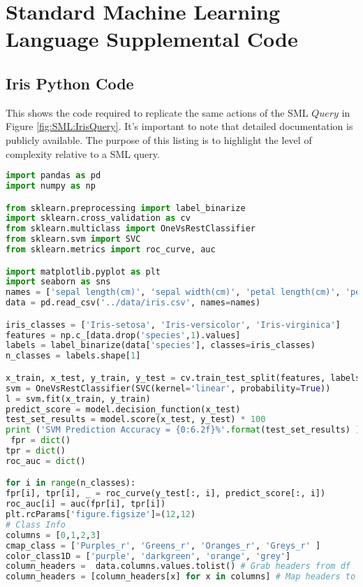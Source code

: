 \chapter{Standard Machine Learning Language Supplemental Code}
\section{Iris Python Code} \label{Appendix:Iris}

This shows the code required to replicate the same actions of the SML \(Query\) in Figure \ref{fig:SML:IrisQuery}.  It's important to note that detailed documentation is publicly available. The purpose of this listing is to highlight the level of complexity relative to a SML query.

\begin{lstlisting}[language=python]
import pandas as pd
import numpy as np

from sklearn.preprocessing import label_binarize
import sklearn.cross_validation as cv
from sklearn.multiclass import OneVsRestClassifier
from sklearn.svm import SVC
from sklearn.metrics import roc_curve, auc

import matplotlib.pyplot as plt
import seaborn as sns
names = ['sepal length(cm)', 'sepal width(cm)', 'petal length(cm)', 'petal width(cm)', 'species']
data = pd.read_csv('../data/iris.csv', names=names)

iris_classes = ['Iris-setosa', 'Iris-versicolor', 'Iris-virginica']
features = np.c_[data.drop('species',1).values]
labels = label_binarize(data['species'], classes=iris_classes)
n_classes = labels.shape[1]

x_train, x_test, y_train, y_test = cv.train_test_split(features, labels, test_size=0.25)
svm = OneVsRestClassifier(SVC(kernel='linear', probability=True))
l = svm.fit(x_train, y_train)
predict_score = model.decision_function(x_test)
test_set_results = model.score(x_test, y_test) * 100
print ('SVM Prediction Accuracy = {0:6.2f}%'.format(test_set_results) )
 fpr = dict()
tpr = dict()
roc_auc = dict()

for i in range(n_classes):
fpr[i], tpr[i], _ = roc_curve(y_test[:, i], predict_score[:, i])
roc_auc[i] = auc(fpr[i], tpr[i])
plt.rcParams['figure.figsize']=(12,12)
# Class Info
columns = [0,1,2,3]
cmap_class = ['Purples_r', 'Greens_r', 'Oranges_r', 'Greys_r' ]
color_class1D = ['purple', 'darkgreen', 'orange', 'grey']
column_headers =  data.columns.values.tolist() # Grab headers from df
column_headers = [column_headers[x] for x in columns] # Map headers to indices selected


\end{lstlisting}
